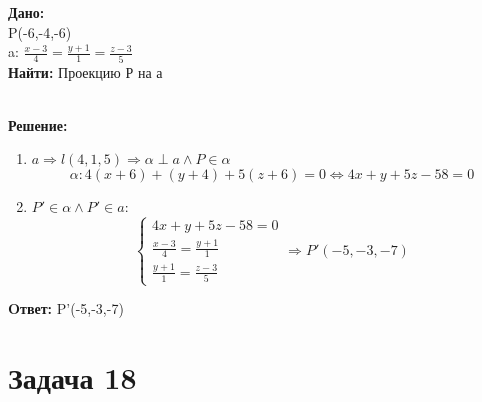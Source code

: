 \documentclass{article}
\begin{document}
\begin{minipage}[t]{0.45\textwidth}

\textbf{Дано:}\\ 
P(-6,-4,-6)\\
a: $ \frac{x-3}{4}= \frac{y+1}{1} = \frac{z-3}{5} $\\
\textbf{Найти: } Проекцию Р на а
\end{minipage}
\begin{minipage}[t]{0.45\textwidth}
  \vspace{-\baselineskip} %

\begin{center}
\end{center}
\end{minipage}
\\
\textbf{Решение:}
\begin{enumerate}
  \item $ a \Rightarrow l(4,1,5) \Rightarrow \alpha \perp a \land P \in \alpha$
    \[
      \alpha: 4(x+6) + (y+4) + 5(z+6) = 0 \Leftrightarrow 4x+y+5z-58 =0 
    \]
  \item $P' \in \alpha \land P' \in a $: 
    \[
      \begin{cases}
        4x+y+5z - 58 =0\\ 
 \frac{x-3}{4}= \frac{y+1}{1}\\ 
 \frac{y+1}{1} = \frac{z-3}{5} 
      \end{cases}
      \Rightarrow P'(-5,-3,-7)
    \]
\end{enumerate}

\textbf{Oтвет: } P'(-5,-3,-7)

\section*{Задача 18}
\end{document}
